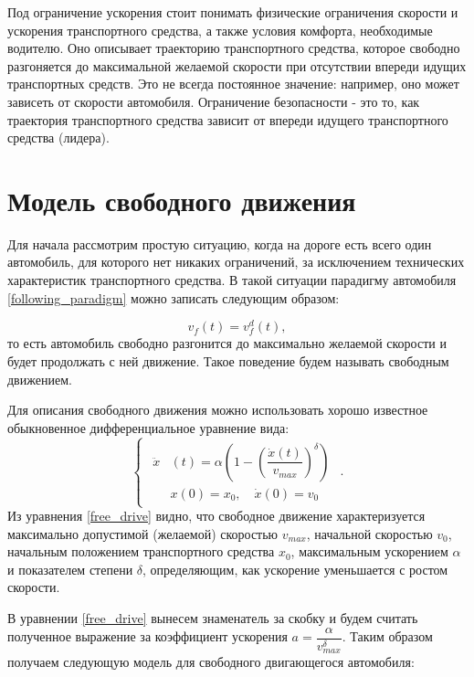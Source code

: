 \documentclass[12pt, a4paper]{extarticle}
\numberwithin{equation}{section}
\begin{document}
Под ограничение ускорения стоит понимать физические ограничения скорости и ускорения транспортного средства, а также условия комфорта, необходимые водителю. Оно описывает траекторию транспортного средства, которое свободно разгоняется до максимальной желаемой скорости при отсутствии впереди идущих транспортных средств. Это не всегда постоянное значение: например, оно может зависеть от скорости автомобиля. Ограничение безопасности - это то, как траектория транспортного средства зависит от впереди идущего транспортного средства (лидера).

\section{Модель свободного движения}

Для начала рассмотрим простую ситуацию, когда на дороге есть всего один автомобиль, для которого нет никаких ограничений, за исключением технических характеристик транспортного средства. В такой ситуации парадигму автомобиля \eqref{following_paradigm} можно записать следующим образом:

\begin{equation*}
v_f(t) = v_f^d(t),
\end{equation*}
то есть автомобиль свободно разгонится до максимально желаемой скорости и будет продолжать с ней движение. Такое поведение будем называть свободным движением. 

Для описания свободного движения можно использовать хорошо известное обыкновенное дифференциальное уравнение вида: 
\begin{equation} \label{free_drive}
\begin{cases}
\begin{split}
\ddot{x}&(t) = \alpha\left( 1-\left( \dfrac{\dot{x}(t)}{v_{max}}\right)^\delta \right) \\
&x(0)=x_0, \quad \dot{x}(0)=v_{0}
\end{split}
\end{cases}.
\end{equation}
Из уравнения \eqref{free_drive} видно, что свободное движение характеризуется максимально допустимой (желаемой) скоростью $v_{max}$, начальной скоростью $v_{0}$, начальным положением транспортного средства $x_0$, максимальным ускорением $\alpha$ и показателем степени $\delta$, определяющим, как ускорение уменьшается с ростом скорости.


В уравнении \eqref{free_drive} вынесем знаменатель за скобку и будем считать полученное выражение за коэффициент ускорения $a=\dfrac{\alpha}{v_{max}^\delta}$. Таким образом получаем следующую модель для свободного двигающегося автомобиля:
\end{document}
